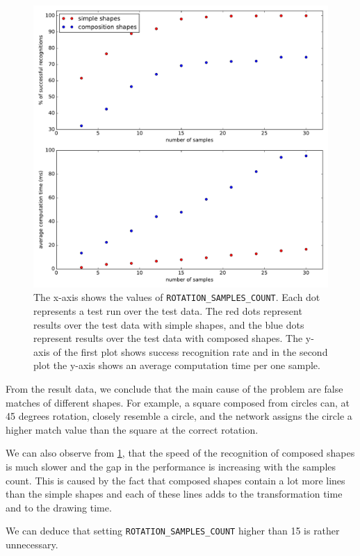 \begin{figure}
\centering
\includegraphics[width=\linewidth]{ext/rotation_cmb.pdf}
\caption{The x-axis shows the values of \texttt{ROTATION\_SAMPLES\_COUNT}. Each dot represents a test run over the test data. The red dots represent results over the test data with simple shapes, and the blue dots represent results over the test data with composed shapes. The y-axis of the first plot shows success recognition rate and in the second plot the y-axis shows an average computation time per one sample.}
\label{fig:rotation}
\end{figure}

From the result data, we conclude that the main cause of the problem are false matches of different shapes. For example, a square composed from circles can, at 45 degrees rotation, closely resemble a circle, and the network assigns the circle a higher match value than the square at the correct rotation.

We can also observe from \cref{fig:rotation}, that the speed of the recognition of composed shapes is much slower and the gap in the performance is increasing with the samples count. This is caused by the fact that composed shapes contain a lot more lines than the simple shapes and each of these lines adds to the transformation time and to the drawing time.

We can deduce that setting \texttt{ROTATION\_SAMPLES\_COUNT} higher than 15 is rather unnecessary.


